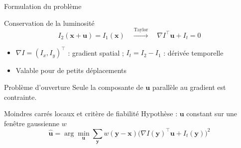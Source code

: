 \documentclass[aspectratio=169, 11pt]{beamer}
\begin{document}
\begin{frame}{Formulation du problème}
  \begin{block}{Conservation de la luminosité}
    \[
      I_2(\bm{x} + \bm{u}) = I_1(\bm{x})
      \quad\xrightarrow{\text{Taylor}}\quad
      \nabla I^\top \bm{u} + I_t = 0
    \]
  \end{block}
  \vspace{2mm}
  \begin{itemize}
    \item $\nabla I = (I_x, I_y)^\top$ : gradient spatial ;
          $I_t = I_2 - I_1$ : dérivée temporelle
    \item Valable pour de petits déplacements
  \end{itemize}
  \vspace{2mm}
  \begin{alertblock}{Problème d'ouverture}
    Seule la composante de $\bm{u}$ parallèle au gradient est contrainte.
  \end{alertblock}
\end{frame}

\begin{frame}{Moindres carrés locaux et critère de fiabilité}
  Hypothèse : $\bm{u}$ constant sur une fenêtre gaussienne $w$
  \[
    \hat{\bm{u}} = \arg\min_{\bm{u}} \sum_{\bm{y}} w(\bm{y} - \bm{x})
    \bigl( \nabla I(\bm{y})^\top \bm{u} + I_t(\bm{y}) \bigr)^2
  \]
\end{frame}
\end{document}
